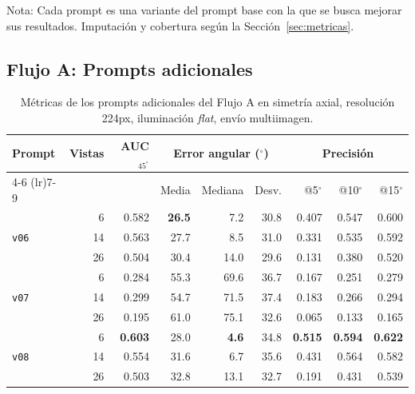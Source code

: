 \begin{table}[H]
\vspace{1.5ex}
\begin{minipage}{\textwidth}
Nota: Cada prompt es una variante del prompt base con la que se busca mejorar sus resultados. Imputación y cobertura según la Sección~\ref{sec:metricas}.
\end{minipage}
\end{table}



\newpage
\clearpage
\subsection{Flujo A: Prompts adicionales}

\begin{table}[H]
\centering
\caption{Métricas de los prompts adicionales del Flujo A en simetría axial, resolución 224px, iluminación \textit{flat}, envío multiimagen.}
\label{tab:nov_axis_adicionales}
\footnotesize
\setlength{\tabcolsep}{3pt}
\renewcommand{\arraystretch}{0.95}

\begin{tabular*}{\textwidth}{@{\extracolsep{\fill}}lrrrrrrrr@{}}
\toprule
\multirow{2}{*}{Prompt} & \multirow{2}{*}{Vistas} & \multirow{2}{*}{AUC$_{45^\circ}$} & \multicolumn{3}{c}{Error angular ($^\circ$)} & \multicolumn{3}{c}{Precisión} \\
\cmidrule(lr){4-6} \cmidrule(lr){7-9}
 &  &  & Media & Mediana & Desv. & @5$^\circ$ & @10$^\circ$ & @15$^\circ$ \\
\midrule
\multirow{3}{*}{\texttt{v06}} & 6 & 0.582 & \textbf{26.5} & 7.2 & 30.8 & 0.407 & 0.547 & 0.600 \\
 & 14 & 0.563 & 27.7 & 8.5 & 31.0 & 0.331 & 0.535 & 0.592 \\
 & 26 & 0.504 & 30.4 & 14.0 & 29.6 & 0.131 & 0.380 & 0.520 \\
\midrule
\multirow{3}{*}{\texttt{v07}} & 6 & 0.284 & 55.3 & 69.6 & 36.7 & 0.167 & 0.251 & 0.279 \\
 & 14 & 0.299 & 54.7 & 71.5 & 37.4 & 0.183 & 0.266 & 0.294 \\
 & 26 & 0.195 & 61.0 & 75.1 & 32.6 & 0.065 & 0.133 & 0.165 \\
\midrule
\multirow{3}{*}{\texttt{v08}} & 6 & \textbf{0.603} & 28.0 & \textbf{4.6} & 34.8 & \textbf{0.515} & \textbf{0.594} & \textbf{0.622} \\
 & 14 & 0.554 & 31.6 & 6.7 & 35.6 & 0.431 & 0.564 & 0.582 \\
 & 26 & 0.503 & 32.8 & 13.1 & 32.7 & 0.191 & 0.431 & 0.539 \\
\bottomrule
\end{tabular*}


\end{table}
